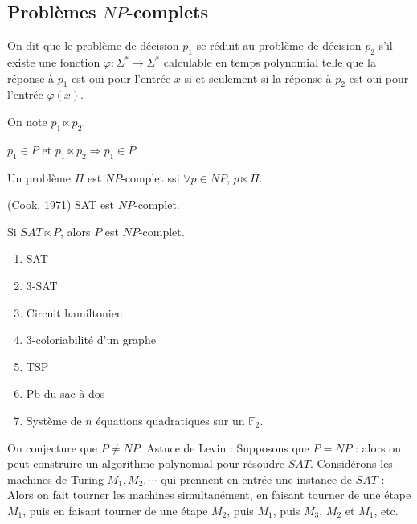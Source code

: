         \subsection{Problèmes $NP$-complets}
            \begin{defi}
                On dit que le problème de décision $p_1$ se réduit au problème de décision $p_2$ s'il existe une fonction $\varphi : \Sigma^* \to \Sigma^*$ calculable en temps polynomial telle que la réponse à $p_1$ est oui pour l'entrée $x$ si et seulement si la réponse à $p_2$ est oui pour l'entrée $\varphi(x)$.
            \end{defi}
            \begin{nota}
                On note $p_1 \ltimes p_2$.
            \end{nota}
            \begin{prop}
                $p_1 \in P$ et $p_1\ltimes p_2 \Rightarrow p_1 \in P$
            \end{prop}
            \begin{defi}
                Un problème $\Pi$ est $NP$-complet ssi $\forall p \in NP$, $p \ltimes \Pi$.
            \end{defi}
            \begin{theo} (Cook, 1971)
                SAT est $NP$-complet.
            \end{theo}
            \begin{remq}
                Si $SAT \ltimes P$, alors $P$ est $NP$-complet.
            \end{remq}
            \begin{expl}
                \begin{enumerate}
                    \item SAT
                    \item $3$-SAT
                    \item Circuit hamiltonien
                    \item $3$-coloriabilité d'un graphe
                    \item TSP
                    \item Pb du sac à dos
                    \item Système de $n$ équations quadratiques sur un $\mathbb{F}_2$.
                \end{enumerate}
            \end{expl}
            On conjecture que $P \neq NP$. Astuce de Levin : Supposons que $P = NP$ : alors on peut construire un algorithme polynomial pour résoudre $SAT$. Considérons les machines de Turing $M_1, M_2, \cdots$ qui prennent en entrée une instance de $SAT$ : Alors on fait tourner les machines simultanément, en faisant tourner de une étape $M_1$, puis en faisant tourner de une étape $M_2$, puis $M_1$, puis $M_3$, $M_2$ et $M_1$, etc. 

